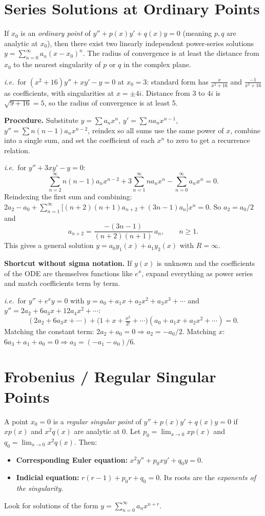 \documentclass[11pt]{article}
\begin{document}
\section*{Series Solutions at Ordinary Points}
If $x_0$ is an \emph{ordinary point} of $y'' + p(x)y' + q(x)y = 0$ (meaning $p, q$ are analytic at $x_0$), then there exist two linearly independent power-series solutions $y = \sum_{n=0}^\infty a_n (x - x_0)^n$. The radius of convergence is at least the distance from $x_0$ to the nearest singularity of $p$ or $q$ in the complex plane.
 
\textit{i.e.}\ for $(x^2 + 16)y'' + xy' - y = 0$ at $x_0 = 3$: standard form has $\frac{x}{x^2 + 16}$ and $\frac{-1}{x^2 + 16}$ as coefficients, with singularities at $x = \pm 4i$. Distance from 3 to $4i$ is $\sqrt{9 + 16} = 5$, so the radius of convergence is at least 5.
 
\textbf{Procedure.} Substitute $y = \sum a_n x^n$, $y' = \sum n a_n x^{n-1}$, $y'' = \sum n(n-1)a_n x^{n-2}$, reindex so all sums use the same power of $x$, combine into a single sum, and set the coefficient of each $x^n$ to zero to get a recurrence relation.
 
\textit{i.e.}\ for $y'' + 3xy' - y = 0$:
\[
\sum_{n=2}^\infty n(n-1)a_n x^{n-2} + 3\sum_{n=1}^\infty n a_n x^n - \sum_{n=0}^\infty a_n x^n = 0.
\]
Reindexing the first sum and combining: $2a_2 - a_0 + \sum_{n=1}^\infty \bigl[(n+2)(n+1)a_{n+2} + (3n - 1)a_n\bigr]x^n = 0$. So $a_2 = a_0/2$ and
\[
a_{n+2} = \frac{-(3n-1)}{(n+2)(n+1)}\,a_n, \qquad n \geq 1.
\]
This gives a general solution $y = a_0 y_1(x) + a_1 y_2(x)$ with $R = \infty$.
 
\textbf{Shortcut without sigma notation.} If $y(x)$ is unknown and the coefficients of the ODE are themselves functions like $e^x$, expand everything as power series and match coefficients term by term.
 
\textit{i.e.}\ for $y'' + e^x y = 0$ with $y = a_0 + a_1 x + a_2 x^2 + a_3 x^3 + \cdots$ and $y'' = 2a_2 + 6a_3 x + 12 a_4 x^2 + \cdots$:
\[
(2a_2 + 6a_3 x + \cdots) + \bigl(1 + x + \tfrac{x^2}{2!} + \cdots\bigr)(a_0 + a_1 x + a_2 x^2 + \cdots) = 0.
\]
Matching the constant term: $2a_2 + a_0 = 0 \Rightarrow a_2 = -a_0/2$. Matching $x$: $6a_3 + a_1 + a_0 = 0 \Rightarrow a_3 = (-a_1 - a_0)/6$.
 
\section*{Frobenius / Regular Singular Points}
A point $x_0 = 0$ is a \emph{regular singular point} of $y'' + p(x)y' + q(x)y = 0$ if $xp(x)$ and $x^2 q(x)$ are analytic at $0$. Let $p_0 = \lim_{x\to 0} xp(x)$ and $q_0 = \lim_{x\to 0} x^2 q(x)$. Then:
\begin{itemize}[leftmargin=*]
    \item \textbf{Corresponding Euler equation:} $x^2 y'' + p_0 x y' + q_0 y = 0$.
    \item \textbf{Indicial equation:} $r(r-1) + p_0 r + q_0 = 0$. Its roots are the \emph{exponents of the singularity}.
\end{itemize}
Look for solutions of the form $y = \sum_{n=0}^\infty a_n x^{n+r}$.
 
\end{document}
